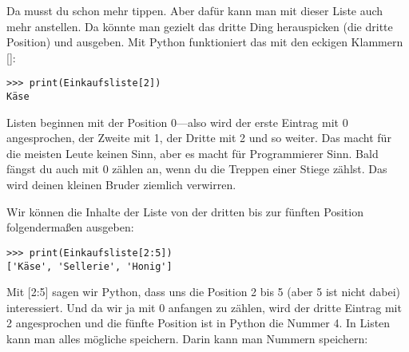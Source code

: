 Da musst du schon mehr tippen. Aber dafür kann man mit dieser Liste auch mehr anstellen. Da könnte man gezielt das dritte Ding herauspicken (die dritte Position) und ausgeben. Mit Python funktioniert das mit den eckigen Klammern []:

\begin{Verbatim}[frame=single]
>>> print(Einkaufsliste[2])
Käse
\end{Verbatim}

Listen beginnen mit der Position 0---also wird der erste Eintrag mit 0 angesprochen, der Zweite mit 1, der Dritte mit 2 und so weiter. Das macht für die meisten Leute keinen Sinn, aber es macht für Programmierer Sinn. Bald fängst du auch mit 0 zählen an, wenn du die Treppen einer Stiege zählst. Das wird deinen kleinen Bruder ziemlich verwirren.
\par
Wir können die Inhalte der Liste von der dritten bis zur fünften Position folgendermaßen ausgeben:

\begin{Verbatim}[frame=single]
>>> print(Einkaufsliste[2:5])
['Käse', 'Sellerie', 'Honig']
\end{Verbatim}

Mit [2:5] sagen wir Python, dass uns die Position 2 bis 5 (aber 5 ist nicht dabei) interessiert. Und da wir ja mit 0 anfangen zu zählen, wird der dritte Eintrag mit 2 angesprochen und die fünfte Position ist in Python die Nummer 4. In Listen kann man alles mögliche speichern. Darin kann man Nummern speichern:

